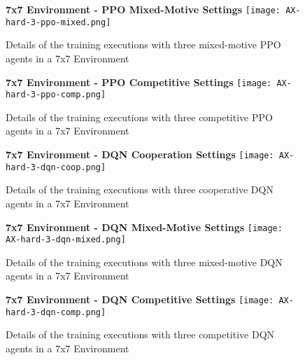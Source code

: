 \newpage
\vfill
\begin{figure}
    \centering
    \textbf{7x7 Environment - PPO Mixed-Motive Settings}
    \texttt{[image: AX-hard-3-ppo-mixed.png]}\\
    \caption[Details of PPO Mixed-Motive Executions in a 7x7 Environment]{Details of the training executions with three mixed-motive PPO agents in a 7x7 Environment}\label{fig:ax-hard-2-ppo-mixed}
\end{figure}
\vfill
\clearpage


\newpage
\vfill
\begin{figure}
    \centering
    \textbf{7x7 Environment - PPO Competitive Settings}
    \texttt{[image: AX-hard-3-ppo-comp.png]}\\
    \caption[Details of PPO Competitive Executions in a 7x7 Environment]{Details of the training executions with three competitive PPO agents in a 7x7 Environment}\label{fig:ax-hard-2-ppo-comp}
\end{figure}
\vfill
\clearpage

\newpage
\vfill
\begin{figure}
    \centering
    \textbf{7x7 Environment - DQN Cooperation Settings}
    \texttt{[image: AX-hard-3-dqn-coop.png]}\\
    \caption[Details of DQN Cooperation Executions in a 7x7 Environment]{Details of the training executions with three cooperative DQN agents in a 7x7 Environment}\label{fig:ax-hard-2-dqn-coop}
\end{figure}
\vfill
\clearpage


\newpage
\vfill
\begin{figure}
    \centering
    \textbf{7x7 Environment - DQN Mixed-Motive Settings}
    \texttt{[image: AX-hard-3-dqn-mixed.png]}\\
    \caption[Details of DQN Mixed-Motive Executions in a 7x7 Environment]{Details of the training executions with three mixed-motive DQN agents in a 7x7 Environment}\label{fig:ax-hard-2-dqn-mixed}
\end{figure}
\vfill
\clearpage

\newpage
\vfill
\begin{figure}
    \centering
    \textbf{7x7 Environment - DQN Competitive Settings}
    \texttt{[image: AX-hard-3-dqn-comp.png]}\\
    \caption[Details of DQN Competitive Executions in a 7x7 Environment]{Details of the training executions with three competitive DQN agents in a 7x7 Environment}\label{fig:ax-hard-2-dqn-comp}
\end{figure}
\vfill
\clearpage


